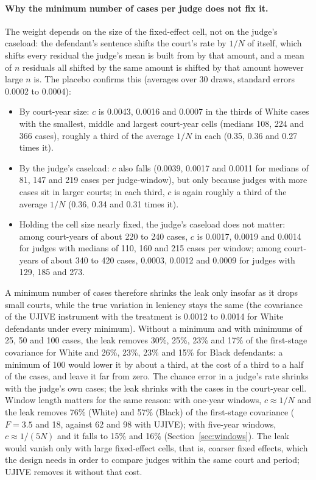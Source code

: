 \documentclass[11pt]{article}
\begin{document}
\paragraph{Why the minimum number of cases per judge does not fix it.} The weight depends on the size of the fixed-effect cell, not on the judge's caseload: the defendant's sentence shifts the court's rate by $1/N$ of itself, which shifts every residual the judge's mean is built from by that amount, and a mean of $n$ residuals all shifted by the same amount is shifted by that amount however large $n$ is. The placebo confirms this (averages over 30 draws, standard errors 0.0002 to 0.0004):
\begin{itemize}
  \item By court-year size: $c$ is 0.0043, 0.0016 and 0.0007 in the thirds of White cases with the smallest, middle and largest court-year cells (medians 108, 224 and 366 cases), roughly a third of the average $1/N$ in each (0.35, 0.36 and 0.27 times it).
  \item By the judge's caseload: $c$ also falls (0.0039, 0.0017 and 0.0011 for medians of 81, 147 and 219 cases per judge-window), but only because judges with more cases sit in larger courts; in each third, $c$ is again roughly a third of the average $1/N$ (0.36, 0.34 and 0.31 times it).
  \item Holding the cell size nearly fixed, the judge's caseload does not matter: among court-years of about 220 to 240 cases, $c$ is 0.0017, 0.0019 and 0.0014 for judges with medians of 110, 160 and 215 cases per window; among court-years of about 340 to 420 cases, 0.0003, 0.0012 and 0.0009 for judges with 129, 185 and 273.
\end{itemize}
A minimum number of cases therefore shrinks the leak only insofar as it drops small courts, while the true variation in leniency stays the same (the covariance of the UJIVE instrument with the treatment is 0.0012 to 0.0014 for White defendants under every minimum). Without a minimum and with minimums of 25, 50 and 100 cases, the leak removes 30\%, 25\%, 23\% and 17\% of the first-stage covariance for White and 26\%, 23\%, 23\% and 15\% for Black defendants: a minimum of 100 would lower it by about a third, at the cost of a third to a half of the cases, and leave it far from zero. The chance error in a judge's rate shrinks with the judge's own cases; the leak shrinks with the cases in the court-year cell. Window length matters for the same reason: with one-year windows, $c \approx 1/N$ and the leak removes 76\% (White) and 57\% (Black) of the first-stage covariance ($F = 3.5$ and 18, against 62 and 98 with UJIVE); with five-year windows, $c \approx 1/(5N)$ and it falls to 15\% and 16\% (Section~\ref{sec:windows}). The leak would vanish only with large fixed-effect cells, that is, coarser fixed effects, which the design needs in order to compare judges within the same court and period; UJIVE removes it without that cost.
\end{document}
